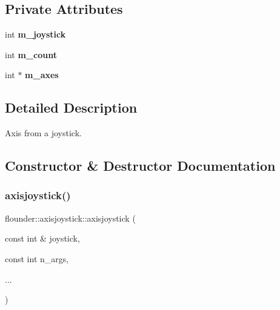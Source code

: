 \subsection*{Private Attributes}
\begin{DoxyCompactItemize}
\item 
\mbox{\label{classflounder_1_1axisjoystick_a8107a9ae34c0ceb53d95efd7f5271db3}} 
int {\bfseries m\+\_\+joystick}
\item 
\mbox{\label{classflounder_1_1axisjoystick_a55c01fefa2832605ff86d610b67cc704}} 
int {\bfseries m\+\_\+count}
\item 
\mbox{\label{classflounder_1_1axisjoystick_aad5c6ca1cfef2ef2f525aa7d7ab76b9b}} 
int $\ast$ {\bfseries m\+\_\+axes}
\end{DoxyCompactItemize}


\subsection{Detailed Description}
Axis from a joystick. 



\subsection{Constructor \& Destructor Documentation}
\mbox{\label{classflounder_1_1axisjoystick_a6415074e9ce0f9aae1d8071dc90a5f93}} 
\subsubsection{\texorpdfstring{axisjoystick()}{axisjoystick()}}
{\footnotesize\ttfamily flounder\+::axisjoystick\+::axisjoystick (\begin{DoxyParamCaption}\item[{const int \&}]{joystick,  }\item[{const int}]{n\+\_\+args,  }\item[{}]{... }\end{DoxyParamCaption})}




